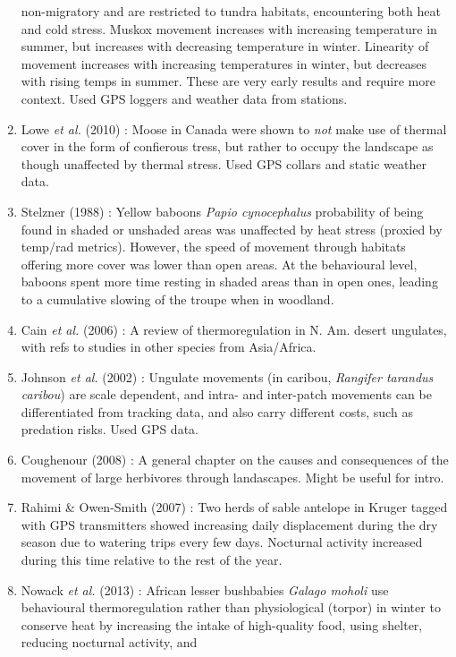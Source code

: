 \documentclass[10pt,twocolumn]{paper}
\begin{document}
\begin{enumerate}
  non-migratory and are restricted to tundra habitats, encountering both
  heat and cold stress. Muskox movement increases with increasing
  temperature in summer, but increases with decreasing temperature in
  winter. Linearity of movement increases with increasing temperatures
  in winter, but decreases with rising temps in summer. These are very
  early results and require more context. Used GPS loggers and weather
  data from stations.
\item
  Lowe \emph{et al.} (2010) : Moose in Canada were shown to \emph{not}
  make use of thermal cover in the form of confierous tress, but rather
  to occupy the landscape as though unaffected by thermal stress. Used
  GPS collars and static weather data.
\item
  Stelzner (1988) : Yellow baboons \emph{Papio cynocephalus} probability
  of being found in shaded or unshaded areas was unaffected by heat
  stress (proxied by temp/rad metrics). However, the speed of movement
  through habitats offering more cover was lower than open areas. At the
  behavioural level, baboons spent more time resting in shaded areas
  than in open ones, leading to a cumulative slowing of the troupe when
  in woodland.
\item
  Cain \emph{et al.} (2006) : A review of thermoregulation in N. Am.
  desert ungulates, with refs to studies in other species from
  Asia/Africa.
\item
  Johnson \emph{et al.} (2002) : Ungulate movements (in caribou,
  \emph{Rangifer tarandus caribou}) are scale dependent, and intra- and
  inter-patch movements can be differentiated from tracking data, and
  also carry different costs, such as predation risks. Used GPS data.
\item
  Coughenour (2008) : A general chapter on the causes and consequences
  of the movement of large herbivores through landascapes. Might be
  useful for intro.
\item
  Rahimi \& Owen-Smith (2007) : Two herds of sable antelope in Kruger
  tagged with GPS transmitters showed increasing daily displacement
  during the dry season due to watering trips every few days. Nocturnal
  activity increased during this time relative to the rest of the year.
\item
  Nowack \emph{et al.} (2013) : African lesser bushbabies \emph{Galago
  moholi} use behavioural thermoregulation rather than physiological
  (torpor) in winter to conserve heat by increasing the intake of
  high-quality food, using shelter, reducing nocturnal activity, and

\end{enumerate}
\end{document}

